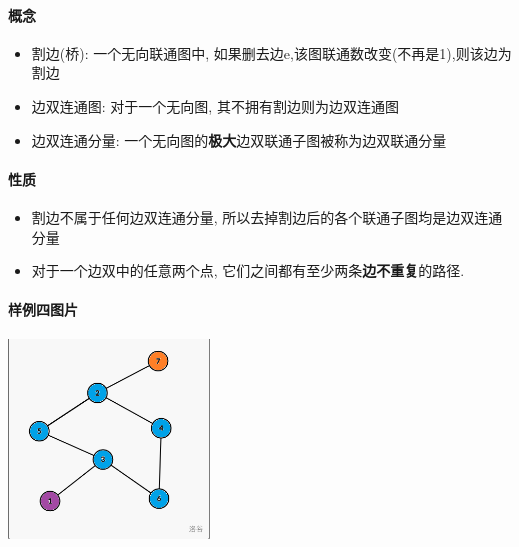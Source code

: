 \paragraph{概念}

\begin{itemize}
    \item 割边(桥): 一个无向联通图中, 如果删去边e,该图联通数改变(不再是1),则该边为割边
    \item 边双连通图: 对于一个无向图, 其不拥有割边则为边双连通图
    \item 边双连通分量: 一个无向图的\textbf{极大}边双联通子图被称为边双联通分量
\end{itemize}

\paragraph{性质}

\begin{itemize}
    \item 割边不属于任何边双连通分量, 所以去掉割边后的各个联通子图均是边双连通分量
    \item 对于一个边双中的任意两个点, 它们之间都有至少两条\textbf{边不重复}的路径.
\end{itemize}

\paragraph{样例四图片}

\begin{center}
    \includegraphics[width=0.4\textwidth]{img/luogu-P8436-1.png}
\end{center}
